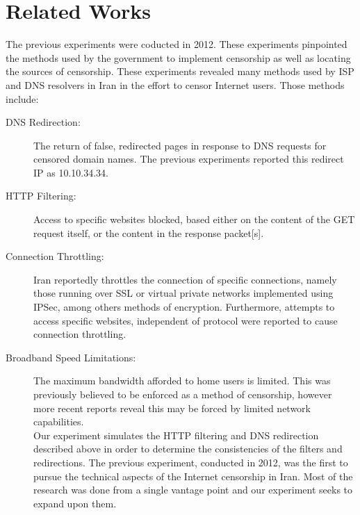 \section{Related Works}\label{sec:relatedworks}

The previous experiments were coducted in 2012. These experiments pinpointed the methods used by the government to implement censorship as well as locating the sources of censorship. These experiments revealed many methods used by ISP and DNS resolvers in Iran in the effort to censor Internet users. Those methods include:

\begin{description}

\item[DNS Redirection:] The return of false, redirected pages in response to DNS requests for censored domain names. The previous experiments reported this redirect IP as 10.10.34.34.\\
\item[HTTP Filtering:] Access to specific websites blocked, based either on the content of the GET request itself, or the content in the response packet[s].\\
\item[Connection Throttling:] Iran reportedly throttles the connection of specific connections, namely those running over SSL or virtual private networks implemented using IPSec, among others methods of encryption. Furthermore, attempts to access specific websites, independent of protocol were reported to cause connection throttling.\\
\item[Broadband Speed Limitations:] The maximum bandwidth afforded to home user\’s is limited. This was previously believed to be enforced as a method of censorship, however more recent reports reveal this may be forced by limited network capabilities.\\
Our experiment simulates the HTTP filtering and DNS redirection described above in order to determine the consistencies of the filters and redirections. The previous experiment, conducted in 2012, was the first to pursue the technical aspects of the Internet censorship in Iran. Most of the research was done from a single vantage point and our experiment seeks to expand upon them.\\

\end{description}
